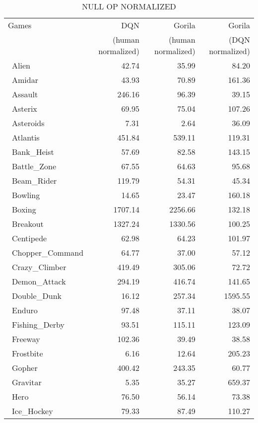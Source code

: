\documentclass{article}
\begin{document}
\begin{table*}[h]
	\vskip 0.5in
	\caption {NULL OP NORMALIZED}
	\centering 
	\begin{tabular}{l|r|r|r}
		\hline \hline
		Games & DQN & Gorila & Gorila \\
		&  (human normalized) & (human normalized) & (DQN normalized) \\
		\hline\
		Alien & 42.74 & 35.99 & 84.20 \\
		\hline\
		Amidar & 43.93 & 70.89 & 161.36 \\
		\hline\
		Assault & 246.16 & 96.39 & 39.15 \\
		\hline\
		Asterix & 69.95 & 75.04 & 107.26 \\
		\hline\
		Asteroids & 7.31 & 2.64 & 36.09 \\
		\hline\
		Atlantis & 451.84 & 539.11 & 119.31 \\
		\hline\
		Bank\_Heist & 57.69 & 82.58 & 143.15 \\
		\hline\
		Battle\_Zone & 67.55 & 64.63 & 95.68 \\
		\hline\
		Beam\_Rider & 119.79 & 54.31 & 45.34 \\
		\hline\
		Bowling & 14.65 & 23.47 & 160.18 \\
		\hline\
		Boxing & 1707.14 & 2256.66 & 132.18 \\
		\hline\
		Breakout & 1327.24 & 1330.56 & 100.25 \\
		\hline\
		Centipede & 62.98 & 64.23 & 101.97 \\
		\hline\
		Chopper\_Command & 64.77 & 37.00 & 57.12 \\
		\hline\
		Crazy\_Climber & 419.49 & 305.06 & 72.72 \\
		\hline\
		Demon\_Attack & 294.19 & 416.74 & 141.65 \\
		\hline\
		Double\_Dunk & 16.12 & 257.34 & 1595.55 \\
		\hline\
		Enduro & 97.48 & 37.11 & 38.07 \\
		\hline\
		Fishing\_Derby & 93.51 & 115.11 & 123.09 \\
		\hline\
		Freeway & 102.36 & 39.49 & 38.58 \\
		\hline\
		Frostbite & 6.16 & 12.64 & 205.23 \\
		\hline\
		Gopher & 400.42 & 243.35 & 60.77 \\
		\hline\
		Gravitar & 5.35 & 35.27 & 659.37 \\
		\hline\
		Hero & 76.50 & 56.14 & 73.38 \\
		\hline\
		Ice\_Hockey & 79.33 & 87.49 & 110.27 \\

\end{tabular}
\end{table*}
\end{document}
